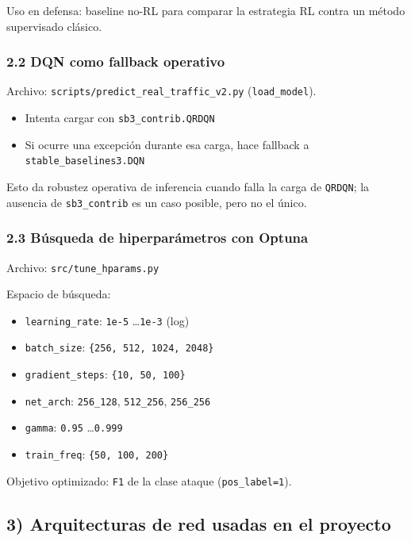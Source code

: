 ﻿\documentclass[12pt,a4paper]{article}
\begin{document}
Uso en defensa: baseline no-RL para comparar la estrategia RL contra un método supervisado clásico.

\subsubsection{2.2 DQN como fallback operativo}

Archivo: \verb|scripts/predict_real_traffic_v2.py| (\texttt{load\_model}).

\begin{itemize}
  \item Intenta cargar con \texttt{sb3\_contrib.QRDQN}
  \item Si ocurre una excepción durante esa carga, hace fallback a \texttt{stable\_baselines3.DQN}
\end{itemize}

Esto da robustez operativa de inferencia cuando falla la carga de \texttt{QRDQN}; la ausencia de
\texttt{sb3\_contrib} es un caso posible, pero no el único.

\subsubsection{2.3 Búsqueda de hiperparámetros con Optuna}

Archivo: \verb|src/tune_hparams.py|

Espacio de búsqueda:

\begin{itemize}
  \item \texttt{learning\_rate}: \texttt{1e-5} \ldots \texttt{1e-3} (log)
  \item \texttt{batch\_size}: \texttt{\{256, 512, 1024, 2048\}}
  \item \texttt{gradient\_steps}: \texttt{\{10, 50, 100\}}
  \item \texttt{net\_arch}: \texttt{256\_128}, \texttt{512\_256}, \texttt{256\_256}
  \item \texttt{gamma}: \texttt{0.95} \ldots \texttt{0.999}
  \item \texttt{train\_freq}: \texttt{\{50, 100, 200\}}
\end{itemize}

Objetivo optimizado: \texttt{F1} de la clase ataque (\texttt{pos\_label=1}).

\subsection{3) Arquitecturas de red usadas en el proyecto}
\end{document}
